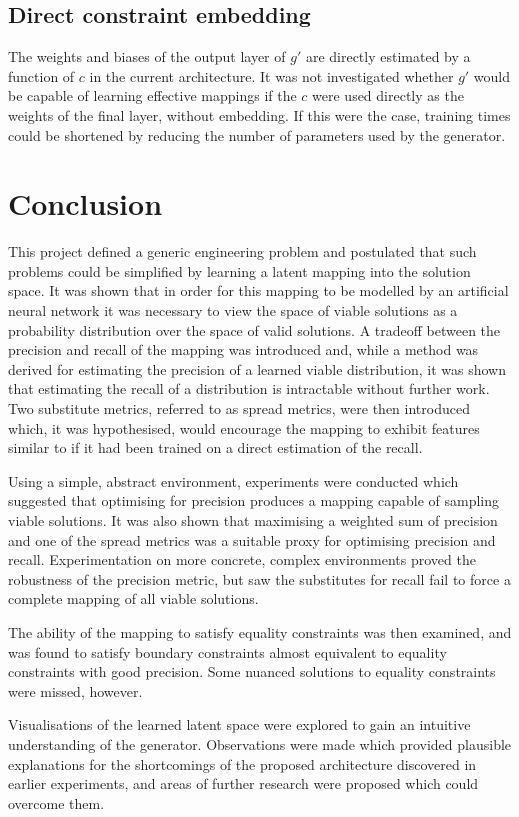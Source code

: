 \documentclass[../../main.tex]{subfiles}
\begin{document}
\subsection{Direct constraint embedding} \label{subsection:directConstraintEmbedding}

The weights and biases of the output layer of $g'$ are directly estimated by a function of $c$ in the current architecture.
It was not investigated whether $g'$ would be capable of learning effective mappings if the $c$ were used directly as the weights of the final layer, without embedding.
If this were the case, training times could be shortened by reducing the number of parameters used by the generator.

\section{Conclusion} \label{section:conclusion}

This project defined a generic engineering problem and postulated that such problems could be simplified by learning a latent mapping into the solution space.
It was shown that in order for this mapping to be modelled by an artificial neural network it was necessary to view the space of viable solutions as a probability distribution over the space of valid solutions.
A tradeoff between the precision and recall of the mapping was introduced and, while a method was derived for estimating the precision of a learned viable distribution, it was shown that estimating the recall of a distribution is intractable without further work.
Two substitute metrics, referred to as spread metrics, were then introduced which, it was hypothesised, would encourage the mapping to exhibit features similar to if it had been trained on a direct estimation of the recall.

Using a simple, abstract environment, experiments were conducted which suggested that optimising for precision produces a mapping capable of sampling viable solutions.
It was also shown that maximising a weighted sum of precision and one of the spread metrics was a suitable proxy for optimising precision and recall.
Experimentation on more concrete, complex environments proved the robustness of the precision metric, but saw the substitutes for recall fail to force a complete mapping of all viable solutions.

The ability of the mapping to satisfy equality constraints was then examined, and was found to satisfy boundary constraints almost equivalent to equality constraints with good precision.
Some nuanced solutions to equality constraints were missed, however.

Visualisations of the learned latent space were explored to gain an intuitive understanding of the generator.
Observations were made which provided plausible explanations for the shortcomings of the proposed architecture discovered in earlier experiments, and areas of further research were proposed which could overcome them.
\end{document}
